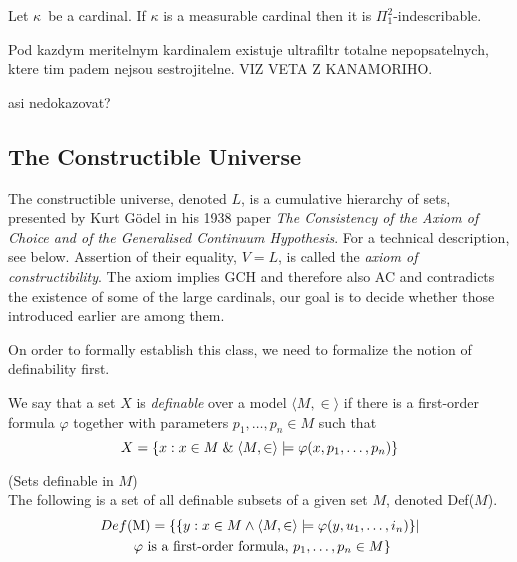 \begin{theorem}
Let $\kappa$ be a cardinal. If $\kappa$ is a measurable cardinal then it is $\Pi^2_1$-indescribable.
\end{theorem}

\begin{theorem}
Pod kazdym meritelnym kardinalem existuje ultrafiltr totalne nepopsatelnych, ktere tim padem nejsou sestrojitelne. VIZ VETA Z KANAMORIHO.
\end{theorem}

asi nedokazovat?


\subsection{The Constructible Universe} %



The constructible universe, denoted $L$, is a cumulative hierarchy of sets, presented by Kurt Gödel in his 1938 paper \emph{The Consistency of the Axiom of Choice and of the Generalised Continuum Hypothesis}. For a technical description, see below. Assertion of their equality, $V=L$, is called the \emph{axiom of constructibility}. The axiom implies GCH and therefore also AC and contradicts the existence of some of the large cardinals, our goal is to decide whether those introduced earlier are among them.

On order to formally establish this class, we need to formalize the notion of definability first. 
\begin{definition}
We say that a set $X$ is \emph{definable} over a model $\langle M, \in \rangle$ if there is a first-order formula $\varphi$ together with parameters $p_1, \ldots, p_n \in M$ such that
\begin{equation}
X = \{x: x \in M \mathrel{\&} \langle M, \in \rangle \models \varphi(x, p_1, \ldots, p_n)\}
\end{equation}
\end{definition}

\begin{definition}{(Sets definable in $M$)}\\
The following is a set of all definable subsets of a given set $M$, denoted Def($M$).
\begin{equation}
\begin{gathered}
Def($M$) = \{\{y : x \in M \land \langle M, \in \rangle \models \varphi(y, u_1, \ldots, i_n) \} |\\
\mbox{ $\varphi$ is a~first-order formula, }p_1, \ldots, p_n \in M \}
\end{gathered}
\end{equation}
\end{definition}

